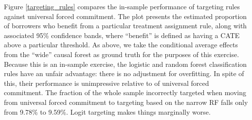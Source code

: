 Figure \ref{targeting_rules} compares the in-sample performance of targeting rules against universal forced commitment. The plot presents the estimated proportion of borrowers who benefit from a particular treatment assignment rule, along with associated 95\% confidence bands, where ``benefit'' is defined as having a CATE above a particular threshold. As above, we take the conditional average effects from the ``wide'' causal forest as ground truth for the purposes of this exercise. Because this is an in-sample exercise, the logistic and random forest classification rules have an unfair advantage: there is no adjustment for overfitting. In spite of this, their performance is unimpressive relative to of universal forced commitment. The fraction of the whole sample incorrectly targeted when moving from universal forced commitment to targeting based on the narrow RF falls only from 9.78\% to 9.59\%. Logit targeting makes things marginally worse. 


